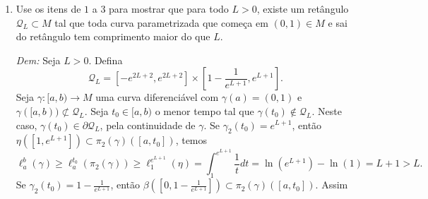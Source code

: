 \documentclass[twoside,openright,titlepage,numbers=noenddot,headinclude,  lineheaders footinclude=true,cleardoublepage=empty,BCOR=5mm,paper=a4,fontsize=12pt ]{scrbook}
\newcommand{\oo}{_}
\begin{document}
\begin{enumerate}
    
    \item Use os itens de $1$ a $3$ para mostrar que para todo $L>0$, existe um retângulo $\mathcal{Q}_L \subset M$ tal que toda curva parametrizada que começa em $(0,1) \in M$ e sai do retângulo tem comprimento maior do que $L$.    
    
    \noindent\textit{Dem:} Seja $L>0$. Defina
    \[
        \mathcal{Q} \oo L  = \left[-e^{2L+2}, e^{2L+2}\right]
        \times \left[1 - \dfrac{1}{e^{L+1}}, e^{L+1} \right].
    \]
    Seja $\gamma : [a,b) \rightarrow M$ uma curva diferenciável com $\gamma (a) = (0,1)$ e $\gamma([a,b))\not \subset \mathcal{Q}\oo L $.
    Seja $t \oo 0 \in [a,b)$ o menor tempo tal que $\gamma (t \oo 0) \not \in \mathcal Q_L$.
    Neste caso, $\gamma (t\oo 0) \in \partial \mathcal{Q} \oo L$, pela continuidade de $\gamma$. 
    Se $\gamma \oo 2 (t \oo 0) = e^{L+1}$, então $ \eta ([1, e^{L+1}])\subset \pi \oo 2 (\gamma)([a, t \oo 0])$, temos
    \[
        \ell \oo a ^b (\gamma ) \geq \ell  \oo a ^{t \oo 0}(\pi\oo 2(\gamma))\geq \ell  \oo 1 ^{e^{L+1}} ( \eta ) = \int \oo 1 ^{e^{L+1}} \dfrac{1}{t}dt = \ln (e^{L+1}) - \ln (1) = L+1 >L.
    \]
    Se $\gamma \oo 2 (t \oo 0) = 1-\frac{1}{e^{L+1}}$, então $\beta   ([0, 1 - \frac{1}{e^{L+1}} ]) \subset \pi \oo 2 (\gamma) ([a, t\oo 0]) $. Assim
    

\end{enumerate}
\end{document}
